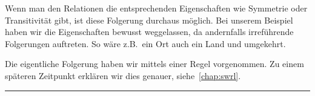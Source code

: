 Wenn man den Relationen die entsprechenden Eigenschaften wie Symmetrie oder Transitivität gibt, ist diese Folgerung durchaus möglich. Bei unserem Beispiel haben wir die Eigenschaften bewusst weggelassen, da andernfalls irreführende Folgerungen auftreten. So wäre z.B.\ ein Ort auch ein Land und umgekehrt.

Die eigentliche Folgerung haben wir mittels einer Regel vorgenommen. Zu einem späteren Zeitpunkt erklären wir dies genauer, siehe~\autoref{chap:swrl}.

\noindent\rule[1ex]{\textwidth}{1pt}
